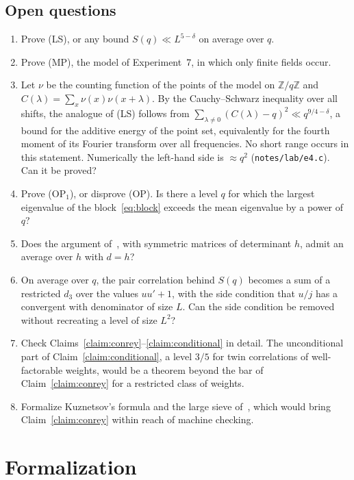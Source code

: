 \documentclass[11pt]{amsart}
\theoremstyle{definition}
\theoremstyle{remark}
\numberwithin{equation}{section}
\newcommand{\Z}{\mathbb Z}
\begin{document}
\subsection{Open questions}\label{sec:open}
\begin{enumerate}
\item Prove (LS), or any bound $S(q)\ll L^{5-\delta}$ on average over $q$.
\item Prove (MP), the model of Experiment~7, in which only finite fields
occur.
\item Let $\nu$ be the counting function of the points of the model on
$\Z/q\Z$ and $C(\lambda)=\sum_x\nu(x)\nu(x+\lambda)$.  By the
Cauchy--Schwarz inequality over all shifts, the analogue of (LS) follows from
$\sum_{\lambda\ne0}(C(\lambda)-q)^2\ll q^{9/4-\delta}$, a bound for the
additive energy of the point set, equivalently for the fourth moment of its
Fourier transform over all frequencies.  No short range occurs in this
statement.  Numerically the left-hand side is $\approx q^2$
(\texttt{notes/lab/e4.c}).  Can it be proved?
\item Prove (OP$_1$), or disprove (OP).  Is there a level $q$ for which the
largest eigenvalue of the block~\eqref{eq:block} exceeds the mean eigenvalue
by a power of $q$?
\item Does the argument of~\cite{GM25}, with symmetric matrices of
determinant $h$, admit an average over $h$ with $d=h$?
\item On average over $q$, the pair correlation behind $S(q)$ becomes a sum
of a restricted $d_3$ over the values $uu'+1$, with the side condition that
$u/j$ has a convergent with denominator of size $L$.  Can the side condition
be removed without recreating a level of size $L^2$?
\item Check Claims~\ref{claim:conrey}--\ref{claim:conditional} in detail.
The unconditional part of Claim~\ref{claim:conditional}, a level $3/5$ for
twin correlations of well-factorable weights, would be a theorem beyond the
bar of Claim~\ref{claim:conrey} for a restricted class of weights.
\item Formalize Kuznetsov's formula and the large sieve
of~\cite{DI82}, which would bring Claim~\ref{claim:conrey} within reach of
machine checking.
\end{enumerate}

\section{Formalization}\label{sec:lean}
\end{document}
